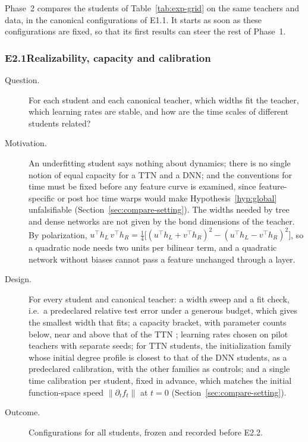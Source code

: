 \documentclass[11pt]{article}
\newcommand{\norm}[1]{\lVert #1\rVert}
\theoremstyle{definition}
\numberwithin{equation}{section}
\begin{document}
Phase~2 compares the students of Table~\ref{tab:exp-grid} on the same teachers and data, in the canonical configurations of E1.1. It starts as soon as these configurations are fixed, so that its first results can steer the rest of Phase~1.

\subsubsection*{E2.1\quad Realizability, capacity and calibration}
\begin{description}
\item[Question.] For each student and each canonical teacher, which widths fit the teacher, which learning rates are stable, and how are the time scales of different students related?
\item[Motivation.] An underfitting student says nothing about dynamics; there is no single notion of equal capacity for a TTN and a DNN; and the conventions for time must be fixed before any feature curve is examined, since feature-specific or post hoc time warps would make Hypothesis~\ref{hyp:global} unfalsifiable (Section~\ref{sec:compare-setting}). The widths needed by tree and dense networks are not given by the bond dimensions of the teacher. By polarization, $u^\top h_L\,v^\top h_R=\tfrac14\big[(u^\top h_L+v^\top h_R)^2-(u^\top h_L-v^\top h_R)^2\big]$, so a quadratic node needs two units per bilinear term, and a quadratic network without biases cannot pass a feature unchanged through a layer.
\item[Design.] For every student and canonical teacher: a width sweep and a fit check, i.e.\ a predeclared relative test error under a generous budget, which gives the smallest width that fits; a capacity bracket, with parameter counts below, near and above that of the TTN \citep[Section~6.7]{hfl_surrogate}; learning rates chosen on pilot teachers with separate seeds; for TTN students, the initialization family whose initial degree profile is closest to that of the DNN students, as a predeclared calibration, with the other families as controls; and a single time calibration per student, fixed in advance, which matches the initial function-space speed $\norm{\partial_tf_t}$ at $t=0$ (Section~\ref{sec:compare-setting}).
\item[Outcome.] Configurations for all students, frozen and recorded before E2.2.
\end{description}
\end{document}
